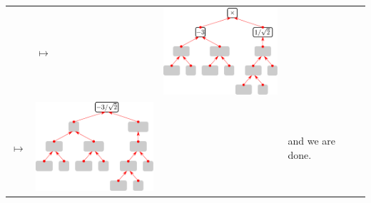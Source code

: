 \begin{eg}
\begin{wfig}
\begin{center}
\begin{tabular}{c m{58mm} c m{58mm} c}
  & $\mapsto$
  & \includegraphics[width=55mm]{tree2d}
  & \\[15ex]
  $\mapsto$
  & \includegraphics[width=55mm]{tree2e}
  & & and we are done.
\end{tabular}
\end{center}
\end{wfig}

\end{eg}


